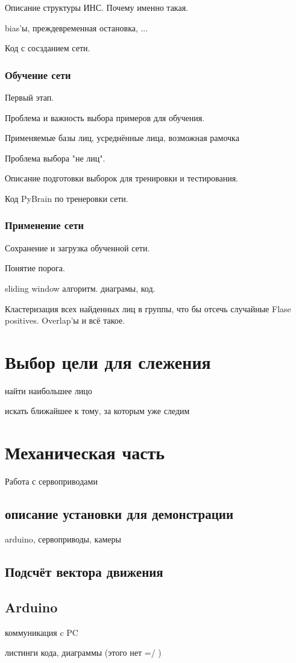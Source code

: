 \documentclass[12pt]{report}
\begin{document}
Описание структуры ИНС. Почему именно такая.

bias'ы, преждевременная остановка, ...

Код с сосзданием сети.
\subsubsection{Обучение сети}
Первый этап.

Проблема и важность выбора примеров для обучения.

Применяемые базы лиц, усреднённые лица, возможная рамочка

Проблема выбора "не лиц".

Описание подготовки выборок для тренировки и тестирования.

Код PyBrain по тренеровки сети.
\subsubsection{Применение сети}
Сохранение и загрузка обученной сети.

Понятие порога.

sliding window алгоритм. диаграмы, код.

Кластеризация всех найденных лиц в группы, что бы отсечь случайные Flase positives. Overlap'ы и всё такое.
\section{Выбор цели для слежения}
найти наибольшее лицо

искать ближайшее к тому, за которым уже следим
\section{Механическая часть}
Работа с сервоприводами
\subsection{описание установки для демонстрации}
arduino,
сервоприводы,
камеры
\subsection{Подсчёт вектора движения}
\subsection{Arduino}
коммуникация c PC

листинги кода, диаграммы (этого нет =/ )
\end{document}
